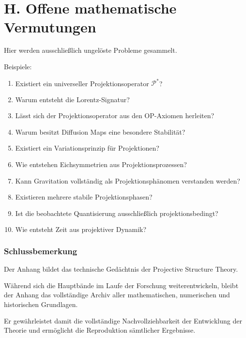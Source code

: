 \part{H. Offene mathematische Vermutungen}

Hier werden ausschließlich ungelöste Probleme gesammelt.

Beispiele:

\begin{enumerate}

\item
Existiert ein universeller Projektionsoperator
$\mathcal P^\ast$?

\item
Warum entsteht die Lorentz-Signatur?

\item
Lässt sich der Projektionsoperator aus den OP-Axiomen
herleiten?

\item
Warum besitzt Diffusion Maps eine besondere Stabilität?

\item
Existiert ein Variationsprinzip für Projektionen?

\item
Wie entstehen Eichsymmetrien aus Projektionsprozessen?

\item
Kann Gravitation vollständig als Projektionsphänomen
verstanden werden?

\item
Existieren mehrere stabile Projektionsphasen?

\item
Ist die beobachtete Quantisierung ausschließlich
projektionsbedingt?

\item
Wie entsteht Zeit aus projektiver Dynamik?

\end{enumerate}


\section*{Schlussbemerkung}

Der Anhang bildet das technische Gedächtnis der Projective Structure Theory.

Während sich die Hauptbände im Laufe der Forschung weiterentwickeln,
bleibt der Anhang das vollständige Archiv aller mathematischen,
numerischen und historischen Grundlagen.

Er gewährleistet damit die vollständige Nachvollziehbarkeit der
Entwicklung der Theorie und ermöglicht die Reproduktion sämtlicher
Ergebnisse.

